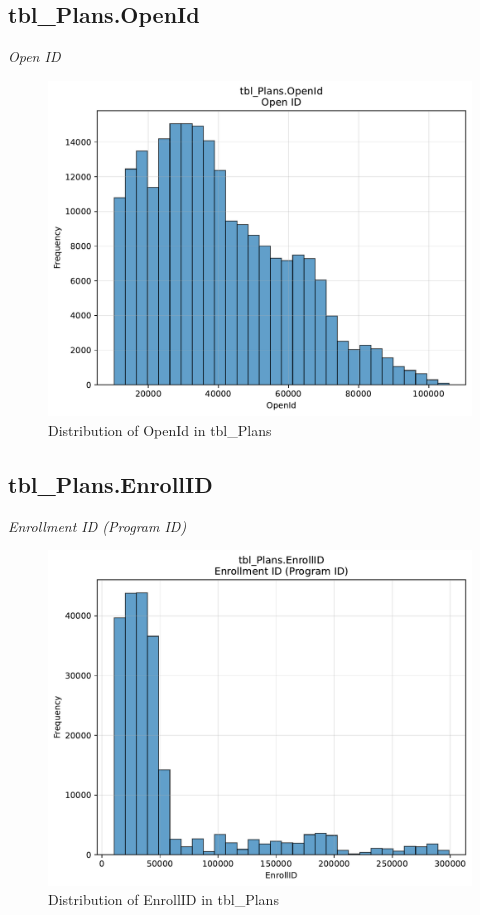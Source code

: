 \subsection{tbl\_Plans.OpenId}
\textit{Open ID}

\begin{figure}[htbp]
\centering
\includegraphics[width=\textwidth]{figures/dbo_tbl_Plans_OpenId.pdf}
\caption{Distribution of OpenId in tbl\_Plans}
\end{figure}\newpage

\subsection{tbl\_Plans.EnrollID}
\textit{Enrollment ID (Program ID)}

\begin{figure}[htbp]
\centering
\includegraphics[width=\textwidth]{figures/dbo_tbl_Plans_EnrollID.pdf}
\caption{Distribution of EnrollID in tbl\_Plans}
\end{figure}\newpage

